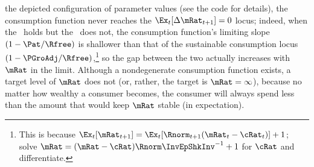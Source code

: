 \documentclass[BufferStockTheory]{subfiles}
\begin{document}
the depicted configuration of parameter values (see the code for details), the consumption function never reaches the
$\Ex_{t}[\Delta \mRat_{t+1}]=0$ locus; indeed, when the \RIC~holds but
the \GIC~does not, the consumption function's limiting slope
$(1-\Pat/\Rfree)$ is shallower than that of the sustainable consumption
locus $(1-\PGroAdj/\Rfree)$,\footnote{This is because
  $\Ex_{t}[\mRat_{t+1}]=\Ex_{t}[\Rnorm_{t+1}(\mRat_{t}-\cRat_{t})]+1$; solve $\mRat = (\mRat - \cRat)\Rnorm \InvEpShkInv^{-1}+1$ for $\cRat$ and differentiate.}
so the gap between the two actually increases with $\mRat$ in the
limit.  Although a nondegenerate consumption function
exists, a target level of $\mRat$ does not (or, rather, the
target is $\mRat=\infty$), because no matter how wealthy a consumer
becomes, the consumer will always spend less than the amount that
would keep $\mRat$ stable (in expectation).

\renewcommand{\figFile}{FVACnotGIC}
\hypertarget{\figFile}{}


\begin{comment}
  The foregoing has some connection with the theoretical results in
  Szeidl~\citeyearpar{szeidlInvariant}, who shows that the condition we
  call the \GIC~guarantees that $\mRat$ will have an asymptotically
  bounded mean.  He also shows that under these circumstances $\mRat$
  satisfies conditions he proves to be necessary for the existence of a
  stable invariant distribution.  Furthermore, $\aRat$, $\bRat$, and $\cRat$
  are also shown to have stable invariant distributions and asymptotically
  bounded means.  We make use of these results below.
\end{comment}

\begin{comment} %
  A final point worth reemphasizing is that neither the Return
  Impatience Condition nor the Finite Human Wealth Condition was
  required for the contraction mapping proof.  Both these conditions are
  necessary for a nondegenerate solution to exist in the unconstrained
  perfect foresight case.  This is noteworthy because in some models and
  in many economists' intuition, the introduction of uncertainty reduces
  the space of parameter values for which a unique solution exists;
  here, precisely the opposite occurs.  Indeed, many of the
  parameterizations newly eligible for solution are quite plausible, so
  this observation is not merely a curiosum but of real practical
  value.\footnote{An easy example of a case where the perfect foresight
    model has no solution is where $\Rfree >1$, $\DiscFac = 1/\Rfree$
    and $\PGro > \Rfree$.}
\end{comment}
\end{document}
